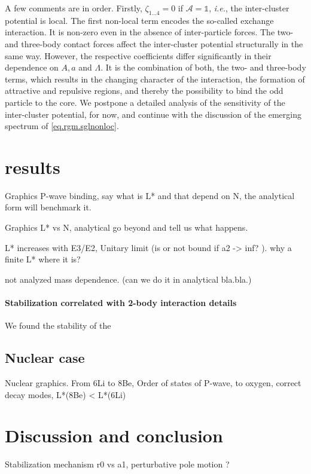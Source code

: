 \documentclass[aps,nofootinbib,prl,showpacs,twocolumn,groupedaddress,superscriptaddress]
{revtex4}
\newcommand{\ie}{\textit{i.e.}\;}
\begin{document}
A few comments are in order. Firstly, $\zeta_{1\ldots4}=0$ if $\mathcal{A}=\mathbb{1}$, \ie, the
inter-cluster potential is local. The first non-local term encodes the so-called exchange interaction.
It is non-zero even in the absence of inter-particle forces. The two- and three-body
contact forces affect the inter-cluster potential structurally in the same way. However, the respective
coefficients differ significantly in their dependence on $A,a$ and $\Lambda$. It is the combination
of both, the two- and three-body terms, which results in the changing character of the interaction,
the formation of attractive and repulsive regions, and thereby the possibility to bind the odd particle
to the core. We postpone a detailed analysis of the sensitivity of the inter-cluster potential,
for now, and continue with the discussion of the emerging spectrum of \eqref{eq.rgm.sglnonloc}.

\section{results}

Graphics P-wave binding, 
say what is L* and that depend on N, 
the analytical form will benchmark it.

Graphics L* vs N, 
analytical go beyond and tell us what happens.

L* increases with E3/E2,
Unitary limit (is or not bound if a2 -> inf? ).
why a finite L* where it is?

not analyzed mass dependence. (can we do it in analytical bla.bla.)

\paragraph{Stabilization correlated with 2-body interaction details}
We found the stability of the

\subsection{Nuclear case}

Nuclear graphics. 
From 6Li to 8Be, 
Order of states of P-wave, 
to oxygen, 
correct decay modes, 
L*(8Be) < L*(6Li)

\section{Discussion and conclusion}

Stabilization mechanism r0 vs a1, 
perturbative pole motion ?
\end{document}
